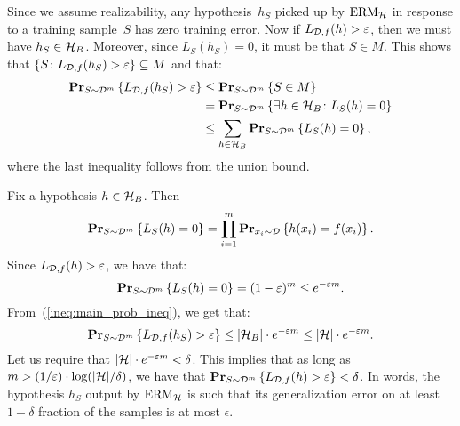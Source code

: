 Since we assume realizability, any hypothesis~$h_S$ picked up by $\text{ERM}_{\mathcal{H}}$
in response to a training sample~$S$ has zero training error. Now if
$L_{\mathcal{D}, f}(h) > \varepsilon$, then we must have $h_S \in \mathcal{H}_{B}$. Moreover, since
$L_S(h_S) = 0$, it must be that $S \in M$. This shows that
$\{S \colon L_{\mathcal{D}, f}(h_S) > \varepsilon\} \subseteq M$ and that:
\begin{align}
    \label{ineq:main_prob_ineq}
    \mathbf{Pr}_{S \sim \mathcal{D}^m} \left \{ L_{\mathcal{D}, f}(h_S) > \varepsilon \right \}
    & \leq \mathbf{Pr}_{S \sim \mathcal{D}^m} \left \{ S \in M \right \} \nonumber \\
    & = \mathbf{Pr}_{S \sim \mathcal{D}^m} \left \{ \exists h \in \mathcal{H}_{B} \colon L_S(h) = 0 \right \} \nonumber \\
    & \leq \sum_{h \in \mathcal{H}_{B}} \mathbf{Pr}_{S \sim \mathcal{D}^m} \left \{ L_S(h) = 0 \right \},
\end{align}
where the last inequality follows from the union bound.

Fix a hypothesis $h \in \mathcal{H}_{B}$. Then
\[
    \mathbf{Pr}_{S \sim \mathcal{D}^m} \left \{ L_S(h) = 0 \right \} =
    \prod_{i = 1}^{m} \mathbf{Pr}_{x_i \sim \mathcal{D}} \left \{ h(x_i) = f(x_i) \right \}.
\]
Since $L_{\mathcal{D}, f}(h) > \varepsilon$, we have that:
\[
    \mathbf{Pr}_{S \sim \mathcal{D}^m} \left \{ L_S(h) = 0 \right \} = (1 - \varepsilon)^m \leq e^{-\varepsilon m }.
\]
From~(\ref{ineq:main_prob_ineq}), we get that:
\begin{equation}
    \mathbf{Pr}_{S \sim \mathcal{D}^m} \left \{ L_{\mathcal{D}, f}(h_S) > \varepsilon \right \}
        \leq \lvert \mathcal{H}_{B} \rvert \cdot e^{-\varepsilon m }
        \leq \lvert \mathcal{H} \rvert \cdot e^{-\varepsilon m }.
\end{equation}
Let us require that $\lvert \mathcal{H} \rvert \cdot e^{-\varepsilon m } < \delta$.
This implies that as long as
$m > (1/\varepsilon) \cdot \log (\lvert \mathcal{H} \rvert / \delta)$, we have that
$\mathbf{Pr}_{S \sim \mathcal{D}^m} \left \{ L_{\mathcal{D}, f}(h) > \varepsilon \right \} < \delta$. In words, the hypothesis
$h_S$ output by $\text{ERM}_{\mathcal{H}}$ is such that its generalization error on at
least $1 - \delta$ fraction of the samples is at most $\epsilon$.


